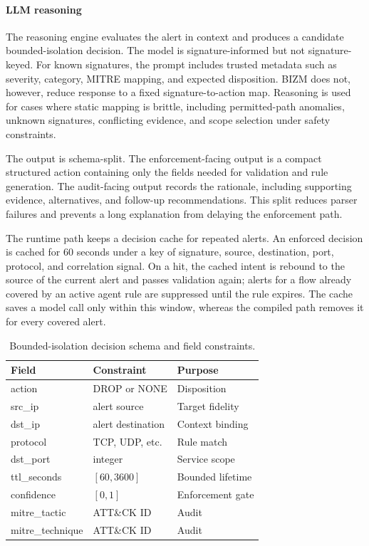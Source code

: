 \documentclass[final,5p]{elsarticle}
\begin{document}
\paragraph{LLM reasoning}
The reasoning engine evaluates the alert in context and produces a candidate bounded-isolation decision. The model is signature-informed but not signature-keyed. For known signatures, the prompt includes trusted metadata such as severity, category, MITRE mapping, and expected disposition. BIZM does not, however, reduce response to a fixed signature-to-action map. Reasoning is used for cases where static mapping is brittle, including permitted-path anomalies, unknown signatures, conflicting evidence, and scope selection under safety constraints.

The output is schema-split. The enforcement-facing output is a compact structured action containing only the fields needed for validation and rule generation. The audit-facing output records the rationale, including supporting evidence, alternatives, and follow-up recommendations. This split reduces parser failures and prevents a long explanation from delaying the enforcement path.

The runtime path keeps a decision cache for repeated alerts. An enforced decision is cached for 60 seconds under a key of signature, source, destination, port, protocol, and correlation signal. On a hit, the cached intent is rebound to the source of the current alert and passes validation again; alerts for a flow already covered by an active agent rule are suppressed until the rule expires. The cache saves a model call only within this window, whereas the compiled path removes it for every covered alert.

\begin{table}[tbp]
    \centering
    \caption{Bounded-isolation decision schema and field constraints.}
    \label{tab:decision_schema}
    \small
    \begin{tabular}{@{}lll@{}}
        \toprule
        \textbf{Field} & \textbf{Constraint} & \textbf{Purpose} \\
        \midrule
        action & DROP or NONE & Disposition \\
        src\_ip & alert source & Target fidelity \\
        dst\_ip & alert destination & Context binding \\
        protocol & TCP, UDP, etc. & Rule match \\
        dst\_port & integer & Service scope \\
        ttl\_seconds & $[60,3600]$ & Bounded lifetime \\
        confidence & $[0,1]$ & Enforcement gate \\
        mitre\_tactic & ATT\&CK ID & Audit \\
        mitre\_technique & ATT\&CK ID & Audit \\
        \bottomrule
    \end{tabular}
\end{table}
\end{document}
